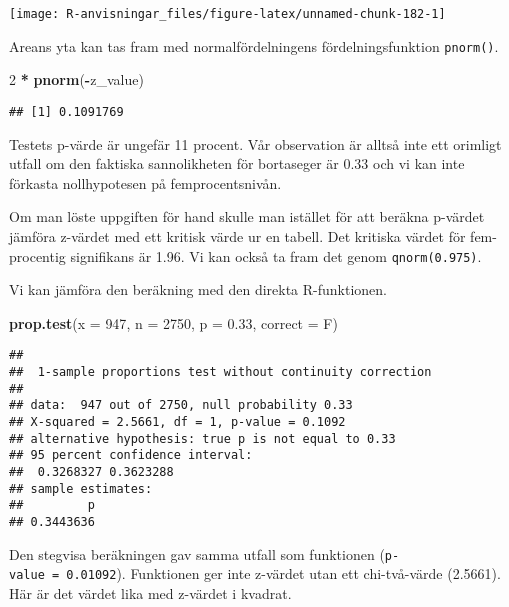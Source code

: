 \documentclass[
]{book}
\newenvironment{Shaded}{\begin{snugshade}}{\end{snugshade}}
\newcommand{\AttributeTok}[1]{\textcolor[rgb]{0.13,0.29,0.53}{#1}}
\newcommand{\DecValTok}[1]{\textcolor[rgb]{0.00,0.00,0.81}{#1}}
\newcommand{\FloatTok}[1]{\textcolor[rgb]{0.00,0.00,0.81}{#1}}
\newcommand{\FunctionTok}[1]{\textcolor[rgb]{0.13,0.29,0.53}{\textbf{#1}}}
\newcommand{\NormalTok}[1]{#1}
\newcommand{\SpecialCharTok}[1]{\textcolor[rgb]{0.81,0.36,0.00}{\textbf{#1}}}
\theoremstyle{definition}
\theoremstyle{definition}
\theoremstyle{definition}
\theoremstyle{definition}
\theoremstyle{remark}
\begin{document}
\begin{center}\texttt{[image: R-anvisningar\_files/figure-latex/unnamed-chunk-182-1]} \end{center}

Areans yta kan tas fram med normalfördelningens fördelningsfunktion \texttt{pnorm()}.

\begin{Shaded}
\begin{Highlighting}[]
\DecValTok{2} \SpecialCharTok{*} \FunctionTok{pnorm}\NormalTok{(}\SpecialCharTok{{-}}\NormalTok{z\_value)}
\end{Highlighting}
\end{Shaded}

\begin{verbatim}
## [1] 0.1091769
\end{verbatim}

Testets p-värde är ungefär 11 procent. Vår observation är alltså inte ett orimligt utfall om den faktiska sannolikheten för bortaseger är 0.33 och vi kan inte förkasta nollhypotesen på femprocentsnivån.

Om man löste uppgiften för hand skulle man istället för att beräkna p-värdet jämföra z-värdet med ett kritisk värde ur en tabell. Det kritiska värdet för fem-procentig signifikans är 1.96. Vi kan också ta fram det genom \texttt{qnorm(0.975)}.

Vi kan jämföra den beräkning med den direkta R-funktionen.

\begin{Shaded}
\begin{Highlighting}[]
\FunctionTok{prop.test}\NormalTok{(}\AttributeTok{x =} \DecValTok{947}\NormalTok{, }\AttributeTok{n =} \DecValTok{2750}\NormalTok{, }\AttributeTok{p =} \FloatTok{0.33}\NormalTok{, }\AttributeTok{correct =}\NormalTok{ F)}
\end{Highlighting}
\end{Shaded}

\begin{verbatim}
## 
##  1-sample proportions test without continuity correction
## 
## data:  947 out of 2750, null probability 0.33
## X-squared = 2.5661, df = 1, p-value = 0.1092
## alternative hypothesis: true p is not equal to 0.33
## 95 percent confidence interval:
##  0.3268327 0.3623288
## sample estimates:
##         p 
## 0.3443636
\end{verbatim}

Den stegvisa beräkningen gav samma utfall som funktionen (\texttt{p-value\ =\ 0.01092}). Funktionen ger inte z-värdet utan ett chi-två-värde (2.5661). Här är det värdet lika med z-värdet i kvadrat.
\end{document}
